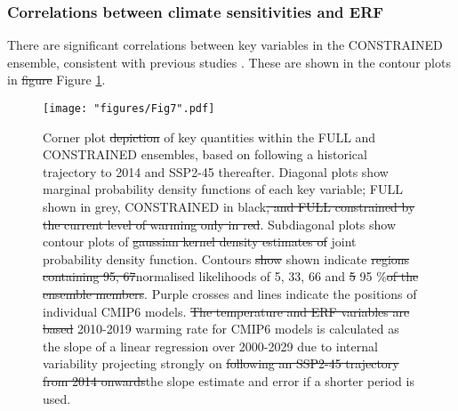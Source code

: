 \documentclass[gmd, manuscript]{copernicus}
\providecommand{\DIFadd}[1]{{\protect\color{blue}#1}} %
\providecommand{\DIFdel}[1]{{\protect\color{red}\sout{#1}}}                      %
\providecommand{\DIFaddbegin}{} %
\providecommand{\DIFaddend}{} %
\providecommand{\DIFdelbegin}{} %
\providecommand{\DIFdelend}{} %
\providecommand{\DIFaddFL}[1]{\DIFadd{#1}} %
\providecommand{\DIFdelFL}[1]{\DIFdel{#1}} %
\providecommand{\DIFaddbeginFL}{} %
\providecommand{\DIFaddendFL}{} %
\providecommand{\DIFdelbeginFL}{} %
\providecommand{\DIFdelendFL}{} %
\begin{document}
\subsubsection{Correlations between climate sensitivities and ERF}
There are significant correlations between key variables in the CONSTRAINED ensemble, consistent with previous studies \citep{Smith2018,Millar2015,Sanderson2020a,Forest2002,Marvel2016}. These are shown in the contour plots in \DIFdelbegin \DIFdel{figure }\DIFdelend \DIFaddbegin \DIFadd{Figure }\DIFaddend \ref{fig:NROY_corr}.
\pagebreak
\begin{figure}[t]
    \DIFdelbeginFL %
\DIFdelendFL \DIFaddbeginFL \texttt{[image: "figures/Fig7".pdf]}
    \DIFaddendFL \caption{Corner plot \DIFdelbeginFL \DIFdelFL{depiction }\DIFdelendFL of \DIFaddbeginFL \DIFaddFL{key quantities within the }\DIFaddendFL FULL and CONSTRAINED ensembles\DIFaddbeginFL \DIFaddFL{, based on following a historical trajectory to 2014 and SSP2-45 thereafter}\DIFaddendFL . Diagonal plots show marginal probability density functions of each key variable; FULL shown in grey, CONSTRAINED in black\DIFdelbeginFL \DIFdelFL{, and FULL constrained by the current level of warming only in red}\DIFdelendFL . Subdiagonal plots show contour plots of \DIFdelbeginFL \DIFdelFL{gaussian kernel density estimates of }\DIFdelendFL joint probability density \DIFaddbeginFL \DIFaddFL{function}\DIFaddendFL . Contours \DIFdelbeginFL \DIFdelFL{show }\DIFdelendFL \DIFaddbeginFL \DIFaddFL{shown }\DIFaddendFL indicate \DIFdelbeginFL \DIFdelFL{regions containing 95, 67}\DIFdelendFL \DIFaddbeginFL \DIFaddFL{normalised likelihoods of 5}\DIFaddendFL , 33\DIFaddbeginFL \DIFaddFL{, 66 }\DIFaddendFL and \DIFdelbeginFL \DIFdelFL{5 }\DIFdelendFL \DIFaddbeginFL \DIFaddFL{95 }\DIFaddendFL \%\DIFdelbeginFL \DIFdelFL{of the ensemble members}\DIFdelendFL . Purple crosses and lines indicate the positions of individual CMIP6 models. \DIFdelbeginFL \DIFdelFL{The temperature and ERF variables are based }\DIFdelendFL \DIFaddbeginFL \DIFaddFL{2010-2019 warming rate for CMIP6 models is calculated as the slope of a linear regression over 2000-2029 due to internal variability projecting strongly }\DIFaddendFL on \DIFdelbeginFL \DIFdelFL{following an SSP2-45 trajectory from 2014 onwards}\DIFdelendFL \DIFaddbeginFL \DIFaddFL{the slope estimate and error if a shorter period is used}\DIFaddendFL .}
    \label{fig:NROY_corr}
\end{figure}
\clearpage
%
\end{document}
